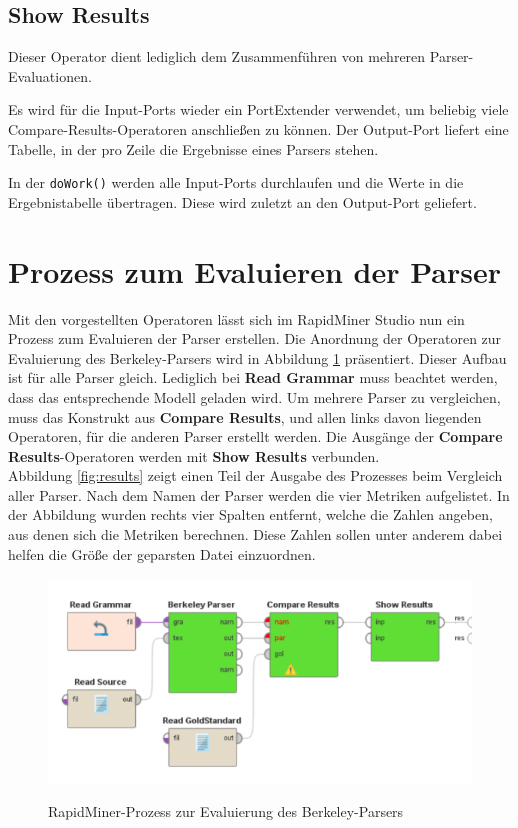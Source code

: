 \subsection{Show Results}

Dieser Operator dient lediglich dem Zusammenführen von mehreren Parser-Evaluationen. 

Es wird für die Input-Ports wieder ein PortExtender verwendet, um beliebig viele Compare-Results-Operatoren anschließen zu können. Der Output-Port liefert eine Tabelle, in der pro Zeile die Ergebnisse eines Parsers stehen.

In der \texttt{doWork()} werden alle Input-Ports durchlaufen und die Werte in die Ergebnistabelle übertragen. Diese wird zuletzt an den Output-Port geliefert.


\section{Prozess zum Evaluieren der Parser}

Mit den vorgestellten Operatoren lässt sich im RapidMiner Studio nun ein Prozess zum Evaluieren der Parser erstellen. Die Anordnung der Operatoren zur Evaluierung des Berkeley-Parsers wird in Abbildung \ref{fig:screenshot-prozess} präsentiert. Dieser Aufbau ist für alle Parser gleich. Lediglich bei \textbf{Read Grammar} muss beachtet werden, dass das entsprechende Modell geladen wird. Um mehrere Parser zu vergleichen,  muss das Konstrukt aus \textbf{Compare Results}, und allen links davon liegenden Operatoren, für die anderen Parser erstellt werden. Die Ausgänge der \textbf{Compare Results}-Operatoren werden mit \textbf{Show Results} verbunden. \\
Abbildung \ref{fig:results} zeigt einen Teil der Ausgabe des Prozesses beim Vergleich aller Parser. Nach dem Namen der Parser werden die vier Metriken aufgelistet. In der Abbildung wurden rechts vier Spalten entfernt, welche die Zahlen angeben, aus denen sich die Metriken berechnen. Diese Zahlen sollen unter anderem dabei helfen die Größe der geparsten Datei einzuordnen.

\begin{figure}
\includegraphics[width=\textwidth]{gfx/berkeley-skizze.png} 
\label{fig:screenshot-prozess}	
\caption{RapidMiner-Prozess zur Evaluierung des Berkeley-Parsers}	
\end{figure}

